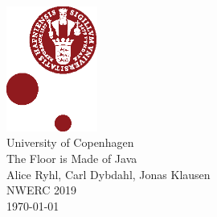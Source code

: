 \documentclass[10pt,a4paper,landscape,oneside]{amsart}
\begin{document}
\pagestyle{empty}

\begin{center}
	\strut
	\vspace{1cm}\\
	\includegraphics[width=3cm]{ku.eps}
	\vspace{0.2cm}\\
	{\Huge University of Copenhagen\\}
	{\fontsize{40}{40}\selectfont The Floor is Made of Java\\}
	\vspace{0.5cm}
	{\Large Alice Ryhl, Carl Dybdahl, Jonas Klausen\\}
	\vfill
	{\huge NWERC 2019}\\
	\vspace{1cm}
	{\Large \today}\\
	\vspace{1cm}
\end{center}
\clearpage

\pagestyle{fancy}
\end{document}
